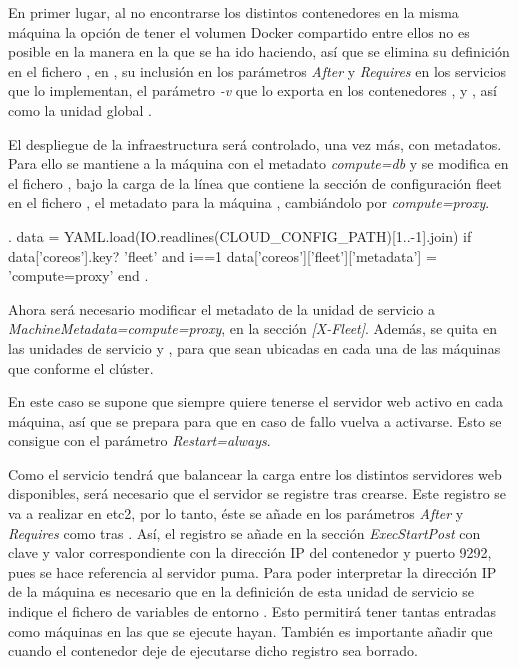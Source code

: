 En primer lugar, al no encontrarse los distintos contenedores en la misma máquina la opción de tener el volumen Docker  compartido entre ellos no es posible en la manera en la que se ha ido haciendo, así que se elimina su definición en el fichero , en , su inclusión en los parámetros \textit{After} y \textit{Requires} en los servicios que lo implementan, el parámetro \textit{-v} que lo exporta en los contenedores ,  y , así como la unidad global .

El despliegue de la infraestructura será controlado, una vez más, con metadatos. Para ello se mantiene a la máquina  con el metadato \textit{compute=db} y se modifica en el fichero , bajo la carga de la línea que contiene la sección de configuración fleet en el fichero , el metadato para la máquina , cambiándolo por \textit{compute=proxy}.

\begin{codelisting}
\label{code:vagrantfile2}
\begin{code}
.
data = YAML.load(IO.readlines(CLOUD_CONFIG_PATH)[1..-1].join)
if data['coreos'].key? 'fleet' and i==1
 data['coreos']['fleet']['metadata'] = 'compute=proxy'
end
.
\end{code}
\end{codelisting}

Ahora será necesario modificar el metadato de la unidad de servicio  a \textit{MachineMetadata=compute=proxy}, en la sección \textit{[X-Fleet]}. Además, se quita  en las unidades de servicio  y , para que sean ubicadas en cada una de las máquinas que conforme el clúster.

En este caso se supone que siempre quiere tenerse el servidor web  activo en cada máquina, así que se prepara para que en caso de fallo vuelva a activarse. Esto se consigue con el parámetro \textit{Restart=always}.

Como el servicio  tendrá que balancear la carga entre los distintos servidores web disponibles, será necesario que el servidor  se registre tras crearse. Este registro se va a realizar en etc2, por lo tanto, éste se añade en los parámetros \textit{After} y \textit{Requires} como  tras . Así, el registro se añade en la sección \textit{ExecStartPost} con clave  y valor correspondiente con la dirección IP del contenedor y puerto 9292, pues se hace referencia al servidor puma. Para poder interpretar la dirección IP de la máquina es necesario que en la definición de esta unidad de servicio se indique el fichero de variables de entorno . Esto permitirá tener tantas entradas  como máquinas en las que se ejecute hayan. También es importante añadir que cuando el contenedor deje de ejecutarse dicho registro sea borrado.

